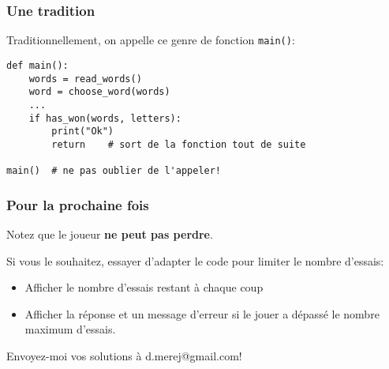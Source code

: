 \documentclass{beamer}
\begin{document}
\begin{frame}[fragile]
  \frametitle{Une tradition}
Traditionnellement, on appelle ce genre de fonction \texttt{main()}:

\begin{lstlisting}
def main():
    words = read_words()
    word = choose_word(words)
    ...
    if has_won(words, letters):
        print("Ok")
        return    # sort de la fonction tout de suite

main()  # ne pas oublier de l'appeler!
\end{lstlisting}
\end{frame}

\begin{frame}[fragile]
  \frametitle{Pour la prochaine fois}

Notez que le joueur \textbf{ne peut pas perdre}.

\vfill

Si vous le souhaitez, essayer d'adapter le code pour limiter le nombre d'essais:

\begin{itemize}
  \item Afficher le nombre d'essais restant à chaque coup
  \item Afficher la réponse et un message d'erreur si le jouer a dépassé le
    nombre maximum d'essais.
\end{itemize}

Envoyez-moi vos solutions à d.merej@gmail.com!

\end{frame}
\end{document}
